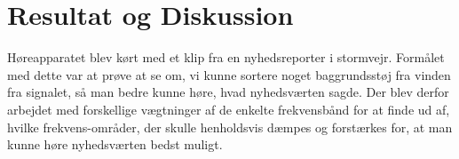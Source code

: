 \chapter{Resultat og Diskussion}\label{ch:Resultat og Diskussion}

Høreapparatet blev kørt med et klip fra en nyhedsreporter i stormvejr. Formålet med dette var at prøve at se om, vi kunne sortere noget baggrundsstøj fra vinden fra signalet, så man bedre kunne høre, hvad nyhedsværten sagde. 
Der blev derfor arbejdet med forskellige vægtninger af de enkelte frekvensbånd for at finde ud af, hvilke frekvens-områder, der skulle henholdsvis dæmpes og forstærkes for, at man kunne høre nyhedsværten bedst muligt.
